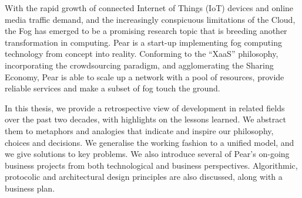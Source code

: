 With the rapid growth of connected Internet of Things (IoT) devices and online media traffic demand, and the increasingly conspicuous limitations of the Cloud, the Fog has emerged to be a promising research topic that is breeding another transformation in computing. Pear is a start-up implementing fog computing technology from concept into reality. Conforming to the ``XaaS'' philosophy, incorporating the crowdsourcing paradigm, and agglomerating the Sharing Economy, Pear is able to scale up a network with a pool of resources, provide reliable services and make a subset of fog touch the ground. 

In this thesis, we provide a retrospective view of development in related fields over the past two decades, with highlights on the lessons learned. We abstract them to metaphors and analogies that indicate and inspire our philosophy, choices and decisions. We generalise the working fashion to a unified model, and we give solutions to key problems. We also introduce several of Pear's on-going business projects from both technological and business perspectives. Algorithmic, protocolic and architectural design principles are also discussed, along with a business plan.   

\vspace{12pt}
